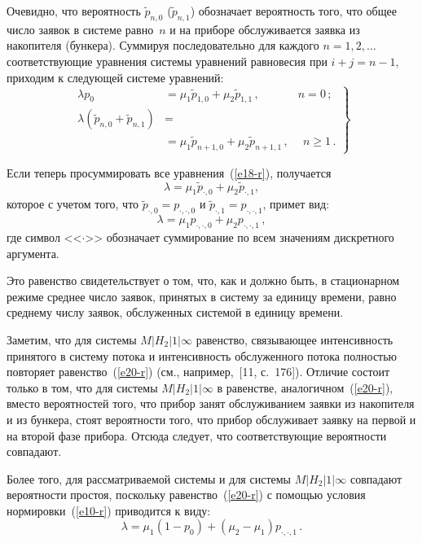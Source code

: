 \begin{multicols}{2}
Очевидно, что вероятность $\tilde{p}_{n,0}$ ($\tilde{p}_{n,1}$)
обозначает вероятность того, что общее число заявок в системе равно~$n$ 
и на приборе обслуживается заявка из накопителя (бункера).
Суммируя последовательно для каждого $n=1,2,\dots$ соответствующие
уравнения системы уравнений равновесия при $i+j=n-1$, приходим к следующей системе уравнений:
\begin{equation}
\left.
\begin{array}{rlr}
\!\!\!\!\!\!\lambda p_0 &= \mu_1 \tilde{p}_{1,0} + \mu_2 \tilde{p}_{1,1}\,, & n =0\,;\\
\!\!\!\!\!\!\lambda (\tilde{p}_{n,0} + \tilde{p}_{n,1}) &=&\\
&\!\!\!\!{}= \mu_1 \tilde{p}_{n+1,0} + \mu_2 \tilde{p}_{n+1,1}\,, & \ \ n \ge 1\,.\!   
\end{array}
\right\}\!\!
\label{e18-r}
\end{equation}

Если теперь просуммировать все уравнения~(\ref{e18-r}), получается
\begin{equation*}
\label{e19-r}
\lambda = \mu_1 \tilde{p}_{\cdot,0} + \mu_2 \tilde{p}_{\cdot,1},
\end{equation*}
которое с учетом того, что $\tilde{p}_{\cdot,0}=p_{\cdot, \cdot, 0}$ и
$\tilde{p}_{\cdot,1}=p_{\cdot, \cdot, 1}$, примет вид:
\begin{equation}
\label{e20-r}
\lambda = \mu_1 p_{\cdot, \cdot,0} + \mu_2 p_{\cdot, \cdot,1}\,,
\end{equation}
где символ <<$\cdot$>> обозначает суммирование по
всем значениям дискретного аргумента.

Это равенство свидетельствует о том, что, как и должно быть, в стационарном
режиме среднее число заявок, принятых в систему за единицу времени,
равно среднему числу заявок, обслуженных системой в единицу времени.

Заметим, что для системы $M|H_2|1|\infty$ равенство,
связывающее интенсивность принятого в систему потока и интенсивность
обслуженного потока полностью повторяет равенство~(\ref{e20-r})
(см., например,~[11, с.~176]).
Отличие состоит только в том, что для системы $M|H_2|1|\infty$
в равенстве, аналогичном~(\ref{e20-r}),
вместо вероятностей того, что прибор занят обслуживанием заявки
из накопителя и из бункера, стоят вероятности того, что прибор обслуживает
заявку на первой и на второй фазе прибора.
Отсюда следует, что соответствующие вероятности совпадают.

Более того, для рассматриваемой системы и для системы $M|H_2|1|\infty$
совпадают вероятности простоя, поскольку равенство~(\ref{e20-r})
с помощью условия нормировки~(\ref{e10-r}) приводится к виду:
\begin{equation}
\label{e21n-r}
\lambda= \mu_1 (1-p_0) + (\mu_2-\mu_1) p_{\cdot, \cdot, 1}\,.
\end{equation}


\end{multicols}
